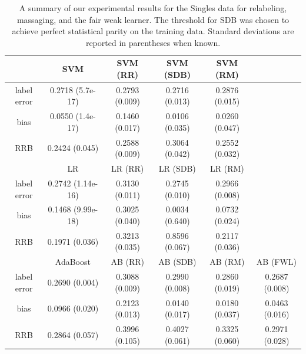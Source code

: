 \documentclass[twoside,leqno,twocolumn]{article}
\begin{document}
\clearpage
\begin{table}[h]
\centering
\begin{tabular}{| c | ccccc |}
\hline
               & SVM & SVM (RR) & SVM (SDB) & SVM (RM) & \\
\hline
label error    & 0.2718 (5.7e-17)& 0.2793 (0.009) & 0.2716 (0.013) & 0.2876 (0.015)& \\
bias           & 0.0550 (1.4e-17)& 0.1460 (0.017) & 0.0106 (0.035) & 0.0260 (0.047)& \\
RRB            & 0.2424 (0.045)& 0.2588 (0.009) & 0.3064 (0.042) & 0.2552 (0.032)&\\
\hline
               & LR & LR (RR)  & LR (SDB)  & LR (RM)  &  \\
\hline
label error    & 0.2742 (1.14e-16)& 0.3130 (0.011) & 0.2745 (0.010) & 0.2966 (0.008)&\\
bias           & 0.1468 (9.99e-18)& 0.3025 (0.040) & 0.0034 (0.640) & 0.0732 (0.024)&\\
RRB            & 0.1971 (0.036)& 0.3213 (0.035) & 0.8596 (0.067) & 0.2117 (0.036)& \\
\hline
               & AdaBoost & AB (RR) & AB (SDB) & AB (RM) & AB (FWL)   \\
\hline
label error    & 0.2690 (0.004)& 0.3088 (0.009) & 0.2990 (0.008) & 0.2860 (0.019) & 0.2687 (0.008)\\
bias           & 0.0966 (0.020)& 0.2123 (0.013) & 0.0140 (0.017) & 0.0180 (0.037) & 0.0463 (0.016)\\
RRB            & 0.2864 (0.057)& 0.3996 (0.105) & 0.4027 (0.061) & 0.3325 (0.060) & 0.2971 (0.028)\\
\hline
\hline
\end{tabular}
\caption{A summary of our experimental results for the Singles data for
relabeling, massaging, and the fair weak learner. The threshold for SDB was
chosen to achieve perfect statistical parity on the training data. Standard
deviations are reported in parentheses when known. }
\label{table:singles_results}
\end{table}
\end{document}
